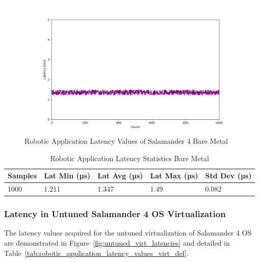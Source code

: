 \documentclass[MMR,Master,english]{style/twbook}
\begin{document}
\begin{figure}[H]
	\centering
	\includegraphics[width=1.0\columnwidth]{img/implementation/rtos_latencies.png}
	\caption{Robotic Application Latency Values of Salamander 4 Bare Metal}
	\label{fig:rtos_latencies}
\end{figure}

\begin{table}[H]
	\centering
	\caption{Robotic Application Latency Statistics Bare Metal}
	\label{tab:robotic_application_latency_values_hardware}
	\setlength{\tabcolsep}{0.5em} %
	{\renewcommand{\arraystretch}{1.2}%
		\begin{tabular}{|l|l|l|l|l|}
			\hline
			\textbf{Samples} & \textbf{Lat Min (µs)} & \textbf{Lat Avg (µs)} & \textbf{Lat Max (µs)} & \textbf{Std Dev (µs)} \\ \hline

			1000             & 1.211                 & 1.347                 & 1.49                  & 0.082                 \\ \hline
		\end{tabular}}
\end{table}

\clearpage

\subsubsection{Latency in Untuned Salamander 4 OS Virtualization}\label{subsubsec:latency_virtualization}
\noindent The latency values acquired for the untuned virtualization of Salamander 4 OS are demonstrated in Figure~\ref{fig:untuned_virt_latencies} and detailed in Table~\ref{tab:robotic_application_latency_values_virt_def}.
\end{document}
